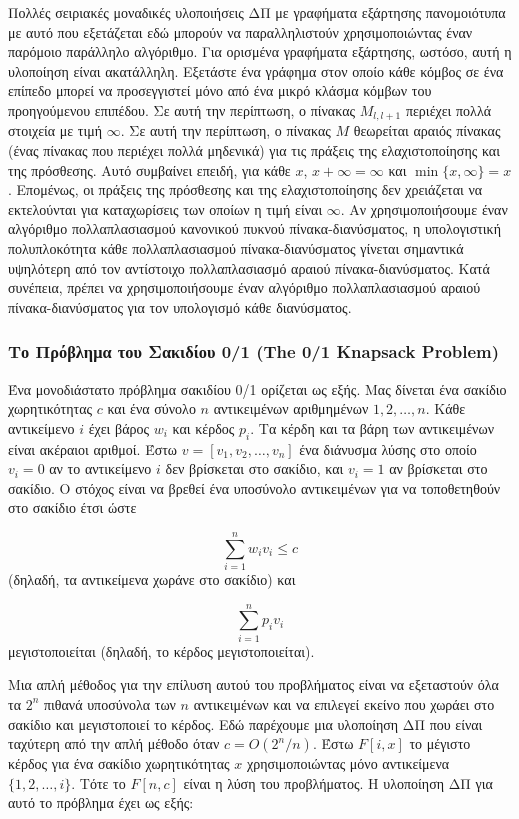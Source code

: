 \documentclass[12pt,a4paper]{article}
\begin{document}
Πολλές σειριακές μοναδικές υλοποιήσεις ΔΠ με γραφήματα εξάρτησης 
πανομοιότυπα με αυτό που εξετάζεται εδώ μπορούν να παραλληλιστούν 
χρησιμοποιώντας έναν παρόμοιο παράλληλο αλγόριθμο. Για ορισμένα 
γραφήματα εξάρτησης, ωστόσο, αυτή η υλοποίηση είναι ακατάλληλη. Εξετάστε 
ένα γράφημα στον οποίο κάθε κόμβος σε ένα επίπεδο μπορεί να προσεγγιστεί 
μόνο από ένα μικρό κλάσμα κόμβων του προηγούμενου επιπέδου. Σε αυτή την 
περίπτωση, ο πίνακας $M_{l,l+1}$ περιέχει πολλά στοιχεία με τιμή 
$\infty$. Σε αυτή την περίπτωση, ο πίνακας $M$ 
θεωρείται αραιός πίνακας (ένας πίνακας που περιέχει 
πολλά μηδενικά) για τις πράξεις της ελαχιστοποίησης και της πρόσθεσης. 
Αυτό συμβαίνει επειδή, για κάθε $x$, $x + \infty = \infty$ και 
$\min\{x, \infty\} = x$. Επομένως, οι πράξεις της πρόσθεσης και της 
ελαχιστοποίησης δεν χρειάζεται να εκτελούνται για καταχωρίσεις των 
οποίων η τιμή είναι $\infty$. Αν χρησιμοποιήσουμε έναν αλγόριθμο 
πολλαπλασιασμού κανονικού πυκνού πίνακα-διανύσματος, η υπολογιστική 
πολυπλοκότητα κάθε πολλαπλασιασμού πίνακα-διανύσματος γίνεται σημαντικά 
υψηλότερη από τον αντίστοιχο πολλαπλασιασμό αραιού πίνακα-διανύσματος. 
Κατά συνέπεια, πρέπει να χρησιμοποιήσουμε έναν αλγόριθμο πολλαπλασιασμού 
αραιού πίνακα-διανύσματος για τον υπολογισμό κάθε διανύσματος.

\subsubsection{Το Πρόβλημα του Σακιδίου 0/1 (\foreignlanguage{english}{The 0/1 Knapsack Problem})}

Ένα μονοδιάστατο πρόβλημα σακιδίου 0/1 ορίζεται ως εξής. Μας δίνεται 
ένα σακίδιο χωρητικότητας $c$ και ένα σύνολο $n$ αντικειμένων 
αριθμημένων $1, 2, \dots, n$. Κάθε αντικείμενο $i$ έχει βάρος $w_i$ και 
κέρδος $p_i$. Τα κέρδη και τα βάρη των αντικειμένων είναι ακέραιοι 
αριθμοί. Έστω $v = [v_1, v_2, \dots, v_n]$ ένα διάνυσμα λύσης στο οποίο 
$v_i = 0$ αν το αντικείμενο $i$ δεν βρίσκεται στο σακίδιο, και 
$v_i = 1$ αν βρίσκεται στο σακίδιο. Ο στόχος είναι να βρεθεί ένα 
υποσύνολο αντικειμένων για να τοποθετηθούν στο σακίδιο έτσι ώστε

\[
\sum_{i=1}^{n} w_i v_i \leq c
\]
\vspace{0.2cm}
\noindent
(δηλαδή, τα αντικείμενα χωράνε στο σακίδιο) και

\[
\sum_{i=1}^{n} p_i v_i
\]
\vspace{0.2cm}
\noindent
μεγιστοποιείται (δηλαδή, το κέρδος μεγιστοποιείται).

Μια απλή μέθοδος για την επίλυση αυτού του προβλήματος είναι να
εξεταστούν όλα τα $2^n$ πιθανά υποσύνολα των $n$ αντικειμένων και να
επιλεγεί εκείνο που χωράει στο σακίδιο και μεγιστοποιεί το κέρδος.
Εδώ παρέχουμε μια υλοποίηση ΔΠ που είναι ταχύτερη από την απλή
μέθοδο όταν $c = O(2^n/n)$. Έστω $F[i, x]$ το μέγιστο κέρδος για
ένα σακίδιο χωρητικότητας $x$ χρησιμοποιώντας μόνο αντικείμενα
$\{1, 2, \ldots, i\}$. Τότε το $F[n, c]$ είναι η λύση του
προβλήματος. Η υλοποίηση ΔΠ για αυτό το πρόβλημα έχει ως εξής:
\end{document}
